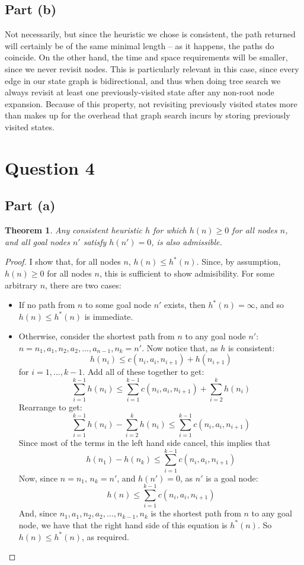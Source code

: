 \documentclass[a4paper,12pt]{scrartcl}
\newtheorem{theorem}{Theorem}
\begin{document}
\subsection*{Part (b)}
Not necessarily, but since the heuristic we chose is consistent, the path returned will certainly be of the same minimal length -- as it happens, the paths do coincide. On the other hand, the time and space requirements will be smaller, since we never revisit nodes. This is particularly relevant in this case, since every edge in our state graph is bidirectional, and thus when doing tree search we always revisit at least one previously-visited state after any non-root node expansion. Because of this property, not revisiting previously visited states more than makes up for the overhead that graph search incurs by storing previously visited states.

\section*{Question 4}
\subsection*{Part (a)}
\begin{theorem}
    Any consistent heuristic $h$ for which $h(n) \geq 0$ for all nodes $n$, and all goal nodes $n'$ satisfy $h(n') = 0$, is also admissible.
\end{theorem}
\begin{proof}
    I show that, for all nodes $n$, $h(n) \leq h^*(n)$. Since, by assumption, $h(n) \geq 0$ for all nodes $n$, this is sufficient to show admisibility. For some arbitrary $n$, there are two cases:
    \begin{itemize}
        \item If no path from $n$ to some goal node $n'$ exists, then $h^*(n) = \infty$, and so $h(n) \leq h^*(n)$ is immediate.
        \item Otherwise, consider the shortest path from $n$ to any goal node $n'$: $n = n_1, a_1, n_2, a_2, ..., a_{n-1}, n_k = n'$. Now notice that, as $h$ is consistent: \[h(n_i) \leq c(n_i, a_i, n_{i+1}) + h(n_{i+1})\] for $i = 1,...,k-1$. Add all of these together to get: \[\sum_{i=1}^{k-1} h(n_i) \leq \sum_{i=1}^{k-1} c(n_i, a_i, n_{i+1}) + \sum_{i=2}^{k} h(n_i)\] Rearrange to get: \[\sum_{i=1}^{k-1} h(n_i) - \sum_{i=2}^{k} h(n_i) \leq \sum_{i=1}^{k-1} c(n_i, a_i, n_{i+1})\] Since most of the terms in the left hand side cancel, this implies that \[h(n_1) - h(n_k) \leq \sum_{i=1}^{k-1} c(n_i, a_i, n_{i+1})\] Now, since $n = n_1$, $n_k = n'$, and $h(n') = 0$, as $n'$ is a goal node: \[h(n) \leq \sum_{i=1}^{k-1} c(n_i, a_i, n_{i+1})\] And, since $n_1, a_1, n_2, a_2, ..., n_{k-1}, n_k$ is the shortest path from $n$ to any goal node, we have that the right hand side of this equation is $h^*(n)$. So $h(n) \leq h^*(n)$, as required.
    \end{itemize}
\end{proof}
\end{document}
